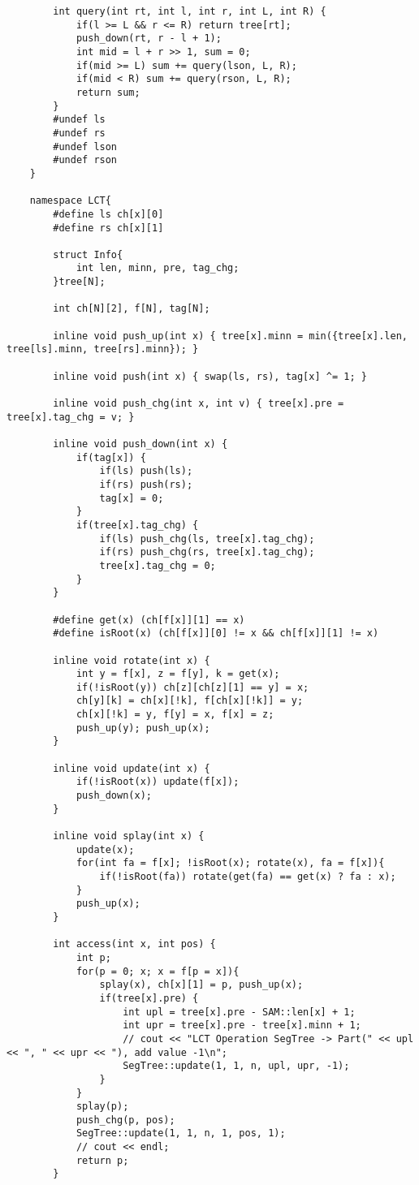 \documentclass[]{article}
\begin{document}
\begin{verbatim}
        int query(int rt, int l, int r, int L, int R) {
            if(l >= L && r <= R) return tree[rt];
            push_down(rt, r - l + 1);
            int mid = l + r >> 1, sum = 0;
            if(mid >= L) sum += query(lson, L, R);
            if(mid < R) sum += query(rson, L, R);
            return sum;
        }
        #undef ls
        #undef rs
        #undef lson
        #undef rson
    }

    namespace LCT{
        #define ls ch[x][0]
        #define rs ch[x][1]

        struct Info{
            int len, minn, pre, tag_chg;
        }tree[N];

        int ch[N][2], f[N], tag[N];

        inline void push_up(int x) { tree[x].minn = min({tree[x].len, tree[ls].minn, tree[rs].minn}); }

        inline void push(int x) { swap(ls, rs), tag[x] ^= 1; }

        inline void push_chg(int x, int v) { tree[x].pre = tree[x].tag_chg = v; }

        inline void push_down(int x) {
            if(tag[x]) {
                if(ls) push(ls);
                if(rs) push(rs);
                tag[x] = 0;
            }
            if(tree[x].tag_chg) {
                if(ls) push_chg(ls, tree[x].tag_chg);
                if(rs) push_chg(rs, tree[x].tag_chg);
                tree[x].tag_chg = 0;
            }
        }

        #define get(x) (ch[f[x]][1] == x)                        
        #define isRoot(x) (ch[f[x]][0] != x && ch[f[x]][1] != x) 

        inline void rotate(int x) {
            int y = f[x], z = f[y], k = get(x);
            if(!isRoot(y)) ch[z][ch[z][1] == y] = x;
            ch[y][k] = ch[x][!k], f[ch[x][!k]] = y;
            ch[x][!k] = y, f[y] = x, f[x] = z;
            push_up(y); push_up(x);
        }

        inline void update(int x) { 
            if(!isRoot(x)) update(f[x]);
            push_down(x);
        }

        inline void splay(int x) {
            update(x);
            for(int fa = f[x]; !isRoot(x); rotate(x), fa = f[x]){
                if(!isRoot(fa)) rotate(get(fa) == get(x) ? fa : x);
            }
            push_up(x);
        }

        int access(int x, int pos) {
            int p;
            for(p = 0; x; x = f[p = x]){
                splay(x), ch[x][1] = p, push_up(x);
                if(tree[x].pre) {
                    int upl = tree[x].pre - SAM::len[x] + 1;
                    int upr = tree[x].pre - tree[x].minn + 1;
                    // cout << "LCT Operation SegTree -> Part(" << upl << ", " << upr << "), add value -1\n";
                    SegTree::update(1, 1, n, upl, upr, -1);
                }
            }
            splay(p);
            push_chg(p, pos);
            SegTree::update(1, 1, n, 1, pos, 1);
            // cout << endl;
            return p;
        }


\end{verbatim}
\end{document}
